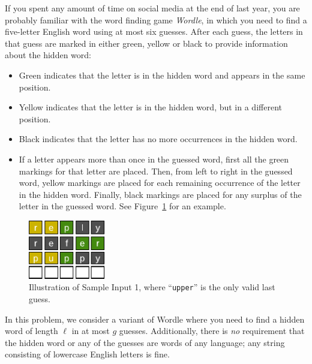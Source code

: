 If you spent any amount of time on social media at the end of last year, you
are probably familiar with the word finding game \emph{Wordle}, in which you
need to find a five-letter English word using at most six guesses. After each
guess, the letters in that guess are marked in either green, yellow or black to
provide information about the hidden word:

\begin{itemize}
  \item Green indicates that the letter is in the hidden word and appears in
    the same position.
\end{itemize}

\begin{itemize}
  \item Yellow indicates that the letter is in the hidden word, but in a
    different position.
  \item Black indicates that the letter has no more occurrences in the hidden word.
  \item If a letter appears more than once in the guessed word, first all the
    green markings for that letter are placed. Then, from left to right in the
    guessed word, yellow markings are placed for each remaining occurrence of
    the letter in the hidden word. Finally, black markings are placed for any
    surplus of the letter in the guessed word. See Figure~\ref{fig:last-guess}
    for an example.
\end{itemize}

\begin{figure}[h]
	\centering
	\includegraphics[width=0.30\textwidth]{sample}
	\caption{Illustration of Sample Input 1, where ``\texttt{upper}'' is
        the only valid last guess.}
	\label{fig:last-guess}
\end{figure}

In this problem, we consider a variant of Wordle where you need to find a
hidden word of length $\ell$ in at most $g$ guesses. Additionally, there is
\emph{no} requirement that the hidden word or any of the guesses are words of
any language; any string consisting of lowercase English letters is fine.

